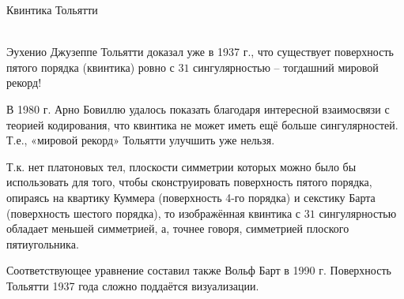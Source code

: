 \documentclass[ru]{./../../common/SurferDesc}%
\begin{document}
\footnotesize


\begin{surferPage}
  \begin{surferTitle}Квинтика Тольятти\end{surferTitle}  \\

Эухенио Джузеппе Тольятти доказал уже в 1937 г., что существует поверхность пятого порядка (квинтика) ровно с $31$ сингулярностью – тогдашний мировой рекорд!


В 1980 г. Арно Бовиллю удалось показать благодаря интересной взаимосвязи с теорией кодирования, что квинтика не может иметь ещё больше сингулярностей. Т.е., «мировой рекорд» Тольятти улучшить уже нельзя.

Т.к. нет платоновых тел, плоскости симметрии которых можно было бы использовать для того, чтобы сконструировать поверхность пятого порядка, опираясь на квартику Куммера (поверхность 4-го порядка) и секстику Барта (поверхность шестого порядка), то изображённая квинтика с $31$ сингулярностью обладает меньшей симметрией, а, точнее говоря, симметрией плоского пятиугольника.

Соответствующее уравнение составил также Вольф Барт в 1990 г. Поверхность Тольятти 1937 года сложно поддаётся визуализации.
  \begin{surferText}
     \end{surferText}
\end{surferPage}
\end{document}
